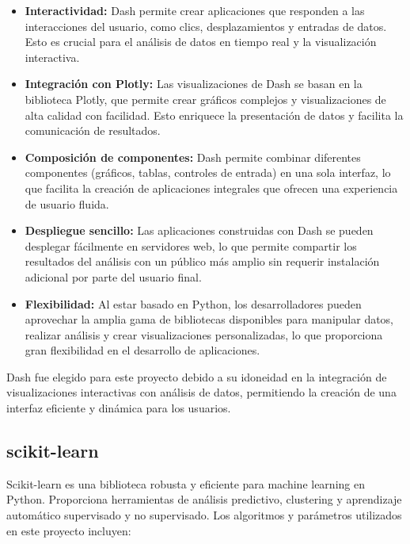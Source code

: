 \begin{itemize}
	\item \textbf{Interactividad:} Dash permite crear aplicaciones que responden a las interacciones del usuario, como clics, desplazamientos y entradas de datos. Esto es crucial para el análisis de datos en tiempo real y la visualización interactiva.
	\item \textbf{Integración con Plotly:} Las visualizaciones de Dash se basan en la biblioteca Plotly, que permite crear gráficos complejos y visualizaciones de alta calidad con facilidad. Esto enriquece la presentación de datos y facilita la comunicación de resultados.
	\item \textbf{Composición de componentes:} Dash permite combinar diferentes componentes (gráficos, tablas, controles de entrada) en una sola interfaz, lo que facilita la creación de aplicaciones integrales que ofrecen una experiencia de usuario fluida.
	\item \textbf{Despliegue sencillo:} Las aplicaciones construidas con Dash se pueden desplegar fácilmente en servidores web, lo que permite compartir los resultados del análisis con un público más amplio sin requerir instalación adicional por parte del usuario final.
	\item \textbf{Flexibilidad:} Al estar basado en Python, los desarrolladores pueden aprovechar la amplia gama de bibliotecas disponibles para manipular datos, realizar análisis y crear visualizaciones personalizadas, lo que proporciona gran flexibilidad en el desarrollo de aplicaciones.
\end{itemize}

Dash fue elegido para este proyecto debido a su idoneidad en la integración de visualizaciones interactivas con análisis de datos, permitiendo la creación de una interfaz eficiente y dinámica para los usuarios.

\subsection{scikit-learn}

Scikit-learn es una biblioteca robusta y eficiente para machine learning en Python. Proporciona herramientas de análisis predictivo, clustering y aprendizaje automático supervisado y no supervisado. Los algoritmos y parámetros utilizados en este proyecto incluyen:

